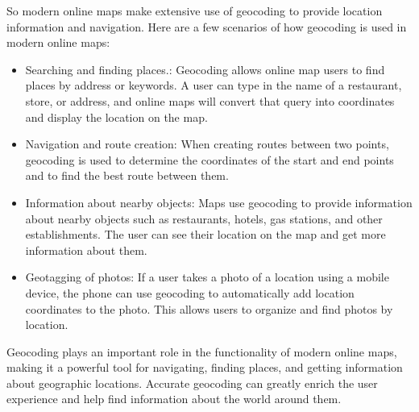 \documentclass[10pt,oneside,english,a4paper]{article}
\begin{document}
So modern online maps make extensive use of geocoding to provide location information and navigation. Here are a few scenarios of how geocoding is used in modern online maps:

\begin{itemize}
\item Searching and finding places.: Geocoding allows online map users to find places by address or keywords. A user can type in the name of a restaurant, store, or address, and online maps will convert that query into coordinates and display the location on the map.
\item Navigation and route creation: When creating routes between two points, geocoding is used to determine the coordinates of the start and end points and to find the best route between them.
\item Information about nearby objects: Maps use geocoding to provide information about nearby objects such as restaurants, hotels, gas stations, and other establishments. The user can see their location on the map and get more information about them.
\item Geotagging of photos: If a user takes a photo of a location using a mobile device, the phone can use geocoding to automatically add location coordinates to the photo. This allows users to organize and find photos by location.
\end{itemize}

Geocoding plays an important role in the functionality of modern online maps, making it a powerful tool for navigating, finding places, and getting information about geographic locations. Accurate geocoding can greatly enrich the user experience and help find information about the world around them. 
\end{document}
